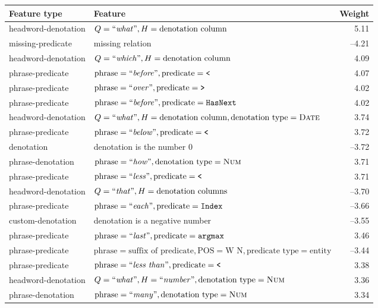 \begin{tabular}{llr}\toprule
\textbf{Feature type} & \textbf{Feature} & \textbf{Weight} \\ \midrule
headword-denotation & $Q = \text{``\emph{what}''}, H = \text{denotation column}$ & 5.11 \\
missing-predicate & missing relation & --4.21 \\
headword-denotation & $Q = \text{``\emph{which}''}, H = \text{denotation column}$ & 4.09 \\
phrase-predicate & $\text{phrase} = \text{``\emph{before}''}, \text{predicate} = \texttt{<}$ & 4.07 \\
phrase-predicate & $\text{phrase} = \text{``\emph{over}''}, \text{predicate} = \texttt{>}$ & 4.02 \\
phrase-predicate & $\text{phrase} = \text{``\emph{before}''}, \text{predicate} = \texttt{Has}{\texttt{Next}}$ & 4.02 \\
headword-denotation & $Q = \text{``\emph{what}''}, H = \text{denotation column}, \text{denotation type} = \textsc{Date}$ & 3.74 \\
phrase-predicate & $\text{phrase} = \text{``\emph{below}''}, \text{predicate} = \texttt{<}$ & 3.72 \\
denotation & denotation is the number 0 & --3.72 \\
phrase-denotation & $\text{phrase} = \text{``\emph{how}''}, \text{denotation type} = \textsc{Num}$ & 3.71 \\
phrase-predicate & $\text{phrase} = \text{``\emph{less}''}, \text{predicate} = \texttt{<}$ & 3.71 \\
headword-denotation & $Q = \text{``\emph{that}''}, H = \text{denotation columns}$ & --3.70 \\
phrase-predicate & $\text{phrase} = \text{``\emph{each}''}, \text{predicate} = \texttt{Index}$ & --3.66 \\
custom-denotation & denotation is a negative number & --3.55 \\
phrase-predicate & $\text{phrase} = \text{``\emph{last}''}, \text{predicate} = \texttt{argmax}$ & 3.46 \\
phrase-predicate & $\text{phrase} = \text{suffix of predicate}, \text{POS} = \text{W N}, \text{predicate type} = \text{entity}$ & --3.44 \\
phrase-predicate & $\text{phrase} = \text{``\emph{less than}''}, \text{predicate} = \texttt{<}$ & 3.38 \\
headword-denotation & $Q = \text{``\emph{what}''}, H = \text{``\emph{number}''}, \text{denotation type} = \textsc{Num}$& 3.36 \\
phrase-denotation & $\text{phrase} = \text{``\emph{many}''}, \text{denotation type} = \textsc{Num}$ & 3.34 \\

\end{tabular}
